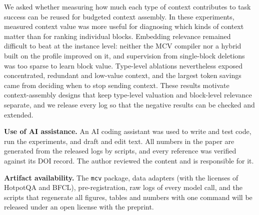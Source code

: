 We asked whether measuring how much each type of context contributes to task success can be reused for budgeted
context assembly. In these experiments, measured context value was more useful for diagnosing which kinds of context
matter than for ranking individual blocks. Embedding relevance remained difficult to beat at the instance level: neither
the MCV compiler nor a hybrid built on the profile improved on it, and supervision from single-block deletions was too
sparse to learn block value. Type-level ablations nevertheless exposed concentrated, redundant and low-value context,
and the largest token savings came from deciding when to stop sending context. These results motivate context-assembly
designs that keep type-level valuation and block-level relevance separate, and we release every log so that the
negative results can be checked and extended.

\textbf{Use of AI assistance.} An AI coding assistant was used to write and test code, run the experiments, and draft
and edit text. All numbers in the paper are generated from the released logs by scripts, and every reference was
verified against its DOI record. The author reviewed the content and is responsible for it.

\textbf{Artifact availability.} The \texttt{mcv} package, data adapters (with the licenses of HotpotQA and BFCL),
pre-registration, raw logs of every model call, and the scripts that regenerate all figures, tables and numbers with one
command will be released under an open license with the preprint.
